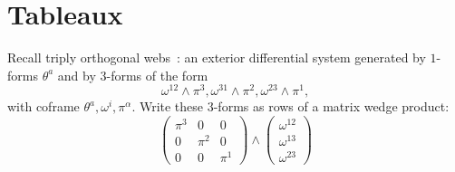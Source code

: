 \chapter{Tableaux}\label{chapter:tableaux}

\begin{example}
Recall triply orthogonal webs~: an exterior differential system generated by \(1\)-forms \(\theta^a\) and by \(3\)-forms of the form
\[
\omega^{12}\wedge\pi^3, \omega^{31}\wedge\pi^2, \omega^{23}\wedge\pi^1, 
\]
with coframe \(\theta^a,\omega^i,\pi^{\alpha}\).
Write these \(3\)-forms as rows of a matrix wedge product:
\[
\begin{pmatrix}
\pi^3 & 0 & 0 \\
0 & \pi^2 & 0 \\
0 & 0 & \pi^1
\end{pmatrix}\wedge
\begin{pmatrix}
\omega^{12}\\
\omega^{13}\\ 
\omega^{23}
\end{pmatrix}
\]
\end{example}

